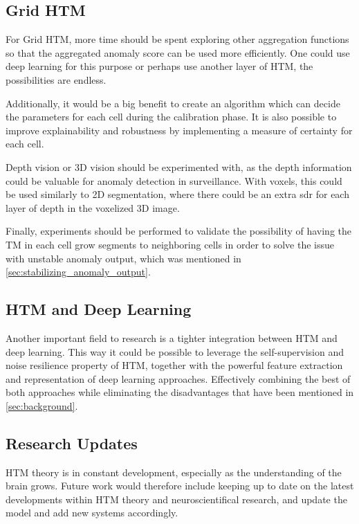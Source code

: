 \subsection*{Grid HTM}
For Grid HTM, more time should be spent exploring other aggregation functions so that the aggregated anomaly score can be used more efficiently. One could use deep learning for this purpose or perhaps use another layer of HTM, the possibilities are endless.
\par
Additionally, it would be a big benefit to create an algorithm which can decide the parameters for each cell during the calibration phase. It is also possible to improve explainability and robustness by implementing a measure of certainty for each cell.
\par
Depth vision or 3D vision should be experimented with, as the depth information could be valuable for anomaly detection in surveillance. With voxels, this could be used similarly to 2D segmentation, where there could be an extra \gls*{sdr} for each layer of depth in the voxelized 3D image.
\par
Finally, experiments should be performed to validate the possibility of having the TM in each cell grow segments to neighboring cells in order to solve the issue with unstable anomaly output, which was mentioned in \autoref{sec:stabilizing_anomaly_output}.
\subsection*{HTM and Deep Learning}
Another important field to research is a tighter integration between HTM and deep learning. This way it could be possible to leverage the self-supervision and noise resilience property of HTM, together with the powerful feature extraction and representation of deep learning approaches. Effectively combining the best of both approaches while eliminating the disadvantages that have been mentioned in \autoref{sec:background}.
\par
\subsection*{Research Updates}
HTM theory is in constant development, especially as the understanding of the brain grows. Future work would therefore include keeping up to date on the latest developments within HTM theory and neuroscientifical research, and update the model and add new systems accordingly.